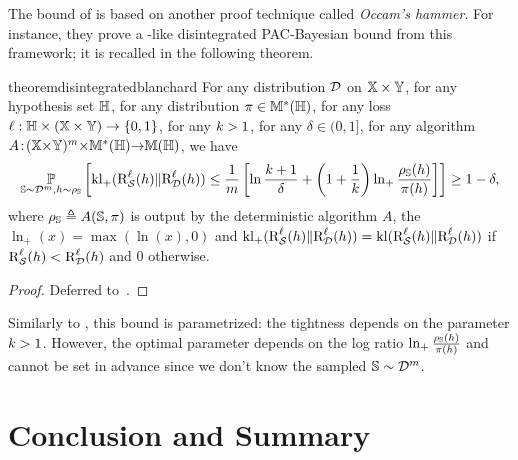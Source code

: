 The bound of \citet{BlanchardFleuret2007} is based on another proof technique called {\it Occam's hammer}.
For instance, they prove a \citet{Seeger2002}-like disintegrated PAC-Bayesian bound from this framework; it is recalled in the following theorem.

\begin{restatable}{theorem}{disintegratedblanchard}\label{chap:pac-bayes:theorem:disintegrated-blanchard}
For any distribution $\mathcal{D}$ on $\mathbb{X}\times\mathbb{Y}$, for any hypothesis set $\mathbb{H}$, for any distribution $\pi\in\mathbb{M}^{*}(\mathbb{H})$, for any loss $\ell: \mathbb{H}\times(\mathbb{X}\times\mathbb{Y})\to \{0,1\}$, for any $k>1$, for any $\delta\in(0, 1]$, for any algorithm \mbox{$A\!:\!(\mathbb{X}{\times}\mathbb{Y})^{m}{\times}\mathbb{M}^{*}(\mathbb{H}){\to} \mathbb{M}(\mathbb{H})$}, we have
\begin{align*}
\operatorname*{\mathbb{P}}_{\mathbb{S}\sim\mathcal{D}^m, h\sim\rho_{\mathbb{S}}}\left[ \operatorname{kl}_{+}(\text{R}^{\ell}_{\mathcal{S}}(h)\|\text{R}^{\ell}_{\mathcal{D}}(h)) \le  \frac{1}{m}\left[\ln\frac{k+1}{\delta}+\left(1+\frac{1}{k}\right)\ln_{+}\frac{\rho_{\mathbb{S}}(h)}{\pi(h)}\right] \right] \ge 1-\delta,
\end{align*}
where $\rho_{\mathbb{S}} \triangleq A(\mathbb{S}, \pi)$ is output by the deterministic algorithm $A$, the $\ln_{+}(x)=\max(\ln(x), 0)$ and $\operatorname{kl}_{+}(\text{R}^{\ell}_{\mathcal{S}}(h)\|\text{R}^{\ell}_{\mathcal{D}}(h))=\operatorname{kl}(\text{R}^{\ell}_{\mathcal{S}}(h)\|\text{R}^{\ell}_{\mathcal{D}}(h))$ if $\text{R}^{\ell}_{\mathcal{S}}(h)<\text{R}^{\ell}_{\mathcal{D}}(h)$ and 0 otherwise.
\end{restatable}
\begin{noaddcontents}\begin{proof}
Deferred to~.
\end{proof}\end{noaddcontents}

Similarly to \citet{Catoni2007}, this bound is parametrized: the tightness depends on the parameter $k>1$.
However, the optimal parameter depends on the log ratio $\ln_{+}\frac{\rho_{\mathbb{S}}(h)}{\pi(h)}$ and cannot be set in advance since we don't know the sampled $\mathbb{S}\sim\mathcal{D}^m$.

\section{Conclusion and Summary}

